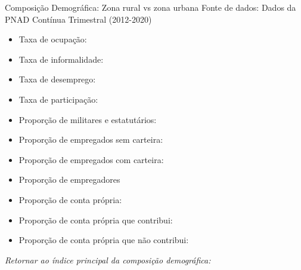 \begin{frame}[label=_composicao_demografica_rural_urbano]{Composição Demográfica: Zona rural vs zona urbana}
{\footnotesize Fonte de dados: Dados da PNAD Contínua Trimestral (2012-2020)}
\begin{itemize}
\item{Taxa de ocupação: \hyperlink{_composicao_demografica_rural_urbano_taxa_de_ocupacao}{}}
\item{Taxa de informalidade: \hyperlink{_composicao_demografica_rural_urbano_taxa_de_informalidade}{}}
\item{Taxa de desemprego: \hyperlink{_composicao_demografica_rural_urbano_taxa_de_desemprego}{}}
\item{Taxa de participação: \hyperlink{_composicao_demografica_rural_urbano_taxa_de_participacao}{}}
\item{Proporção de militares e estatutários: \hyperlink{_composicao_demografica_rural_urbano_prop_militar}{}}
\item{Proporção de empregados sem carteira: \hyperlink{_composicao_demografica_rural_urbano_prop_empregadoSC}{}}
\item{Proporção de empregados com carteira: \hyperlink{_composicao_demografica_rural_urbano_prop_empregadoCC}{}}
\item{Proporção de empregadores \hyperlink{_composicao_demografica_rural_urbano_prop_empregador}{}}
\item{Proporção de conta própria: \hyperlink{_composicao_demografica_rural_urbano_prop_cpropria}{}}
\item{Proporção de conta própria que contribui: \hyperlink{_composicao_demografica_rural_urbano_prop_cpropriaC}{}}
\item{Proporção de conta própria que não contribui: \hyperlink{_composicao_demografica_rural_urbano_prop_cpropriaNc}{}}
\end{itemize}

\begin{small}
\textit{Retornar ao índice principal da composição demográfica: \hyperlink{_composicao_demografica}{} }
\end{small}

\end{frame}

